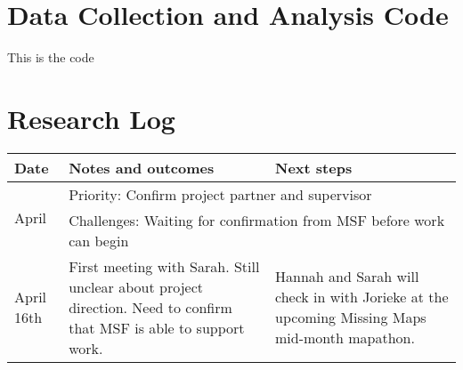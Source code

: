\appendix
\chapter{Data Collection and Analysis Code}
\label{appendixlabel2}

This is the code

\chapter{Research Log}
\label{appendixlabel1}

\begin{singlespace}


\begin{longtable}{|p{2cm}|p{5cm}|p{5cm}} 
\hline
Date                    & Notes and outcomes                                                                                                                                                                                                                                    & Next steps                                                                                                                                                                                                                  \\ 
\hline
\multirow{2}{*}{April}  & \multicolumn{2}{p{8cm}}{Priority: Confirm project partner and supervisor}                                                                                                                                                                                                                                                                                                                                                                                                                \\
   & \multicolumn{2}{p{8cm}}{Challenges: Waiting for confirmation from MSF before work can begin}                                                                                                                                                                                                                                                                                                                                                                                             \\ 
\hline
April 16th              & First meeting with Sarah. Still unclear about project direction. Need to confirm that MSF is able to support work.                                                                                                                                    & Hannah and Sarah will check in with Jorieke at the upcoming Missing Maps mid-month mapathon.                                                                                                                                \\

\end{longtable}
\end{singlespace}
